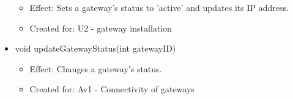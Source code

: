\begin{description}
\begin{itemize}[noitemsep,nolistsep,leftmargin=-.25cm]
\begin{itemize}[noitemsep,nolistsep]
           \item Effect: Sets a gateway's status to 'active' and updates its IP address.
\item Created for: U2 - gateway installation
        \end{itemize}
      \item \textsf{void updateGatewayStatus(int gatewayID)}
        \begin{itemize}[noitemsep,nolistsep]
           \item Effect: Changes a gateway's status.
\item Created for: Av1 - Connectivity of gateways
        \end{itemize}
    \end{itemize}
    \end{description}

